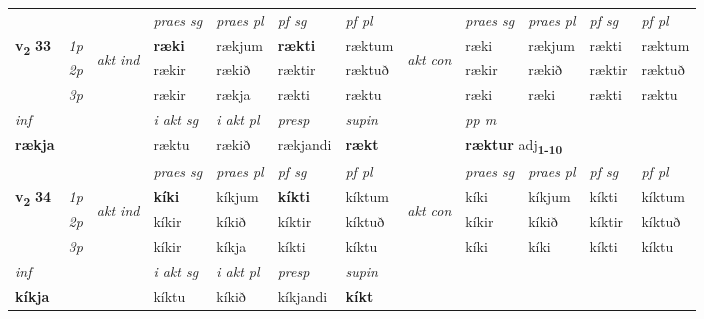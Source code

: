 \begin{longtable}[l]{X>{\footnotesize\itshape}llXXXXlXXXX}
\midrule

 & &   & \textit{praes sg}  & \textit{praes pl}    & \textit{ pf sg} & \textit{pf pl} & & \textit{praes sg}  & \textit{praes pl}    & \textit{pf sg} & \textit{pf pl }  \\ \cmidrule{4-7} \cmidrule{9-12}
 \multirow{2}{*}{{{\textbf{v{\textsubscript{2}}} \Large{\textbf{33}}}}}  & 1p & \multirow{3}{*}{\begin{turn}{90}\textit{akt ind}\end{turn}} & \textbf{ræki} & rækjum & \textbf{rækti} & ræktum & \multirow{3}{*}{\begin{turn}{90}\textit{akt con}\end{turn}} &ræki & rækjum & rækti & ræktum\\*
 & 2p &  &  rækir  & rækið & ræktir & ræktuð & & rækir & rækið & ræktir & ræktuð \\*
 & 3p &  & rækir & rækja & rækti & ræktu & & ræki & ræki& rækti & ræktu \\*
\cmidrule{4-7} \cmidrule{9-12}

   {\textit{inf}} & &  & \textit{i akt sg} & \textit{i akt pl}   & \textit{presp} & \textit{supin}  && \textit{pp m} \\*
  {\textbf{rækja}} & && ræktu  & rækið   & rækjandi &  \textbf{rækt}  && \multicolumn{2}{l}{\textbf{ræktur} adj\textbf{\textsubscript{1-10}}} \\*

\midrule

 & &   & \textit{praes sg}  & \textit{praes pl}    & \textit{ pf sg} & \textit{pf pl} & & \textit{praes sg}  & \textit{praes pl}    & \textit{pf sg} & \textit{pf pl }  \\ \cmidrule{4-7} \cmidrule{9-12}
 \multirow{2}{*}{{{\textbf{v{\textsubscript{2}}} \Large{\textbf{34}}}}}  & 1p & \multirow{3}{*}{\begin{turn}{90}\textit{akt ind}\end{turn}} & \textbf{kíki} & kíkjum & \textbf{kíkti} & kíktum & \multirow{3}{*}{\begin{turn}{90}\textit{akt con}\end{turn}} &kíki & kíkjum & kíkti & kíktum\\*
 & 2p &  &  kíkir  & kíkið & kíktir & kíktuð & & kíkir & kíkið & kíktir & kíktuð \\*
 & 3p &  & kíkir & kíkja & kíkti & kíktu & & kíki & kíki& kíkti & kíktu \\*
\cmidrule{4-7} \cmidrule{9-12}

   {\textit{inf}} & &  & \textit{i akt sg} & \textit{i akt pl}   & \textit{presp} & \textit{supin}   \\*
  {\textbf{kíkja}} & && kíktu  & kíkið   & kíkjandi &  \textbf{kíkt}   \\*


\end{longtable}
